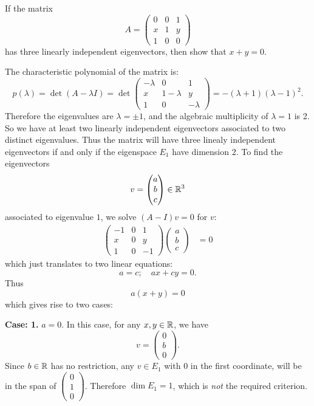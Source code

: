 \documentclass[11pt, a4paper, abstract=true]{scrartcl}
\begin{document}
\begin{problem*}
    If the matrix
    \[A = 
    \begin{pmatrix}
        0 & 0 & 1\\
        x & 1 & y\\
        1 & 0 & 0
    \end{pmatrix}
    \]
    has three linearly independent eigenvectors, then show that \(x+y = 0\).
\end{problem*}
\begin{soln}
    The characteristic polynomial of the matrix is: 
    \[p(\lambda) = \det(A - \lambda I) = \det
    \begin{pmatrix}
        -\lambda & 0 & 1\\
        x & 1-\lambda & y\\
        1 & 0 & -\lambda
    \end{pmatrix}
    = - (\lambda + 1)(\lambda - 1)^2.
    \]
    Therefore the eigenvalues are \(\lambda = \pm 1\), and the algebraic multiplicity of \(\lambda = 1\) is 2. So we have at least two linearly independent eigenvectors associated to two distinct eigenvalues. Thus the matrix will have three linealy independent eigenvectors if and only if the eigenspace \(E_1\) have dimension \(2\). To find the eigenvectors 
    \[v = 
        \begin{pmatrix}
            a\\
            b\\
            c
        \end{pmatrix} \in \mathbb R^3
    \] associated to eigenvalue \(1\), we solve \((A - I) v = 0\) for \(v\): 
    \begin{align*}
        \begin{pmatrix}
            -1 & 0 & 1\\
            x & 0 & y\\
            1 & 0 & -1
        \end{pmatrix}
        \begin{pmatrix}
            a\\
            b\\
            c
        \end{pmatrix} &= 0
    \end{align*}
    which just translates to two linear equations: \[a = c; \quad ax + cy = 0. \] Thus \[a(x+y) = 0\] which gives rise to two cases:
    
    \noindent\textbf{Case: 1.} \(a = 0.\) In this case, for any \(x, y \in \mathbb R\), we have \[v = \begin{pmatrix}
        0\\
        b\\
        0
    \end{pmatrix}.
    \]
    Since \(b \in \mathbb R\) has no restriction, any \(v \in E_1\) with \(0\) in the first coordinate, will be in the span of \(
        \begin{pmatrix}
        0\\
        1\\
        0
    \end{pmatrix}
    \). Therefore \(\dim E_1 = 1\), which is \emph{not} the required criterion.
    

\end{soln}
\end{document}
